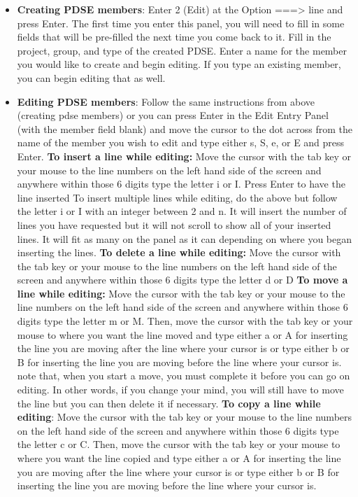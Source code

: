 \documentclass{report}
\begin{document}
\begin{itemize}
        \item \textbf{Creating PDSE members}: Enter 2 (Edit) at the Option ===> line and press Enter. The first time you enter this panel, you will need to fill in some fields that will be pre-filled the next time you come back to it.
            \bigbreak \noindent 
            Fill in the project, group, and type of the created PDSE. Enter a name for the member you would like to create and begin editing. If you type an existing member, you can begin editing that as well.
        \item \textbf{Editing PDSE members}: Follow the same instructions from above (creating pdse members) or you can press Enter in the Edit Entry Panel (with the member field blank) and move the cursor to the dot across from the name of the member you wish to edit and type either s, S, e, or E and press Enter.
            \bigbreak \noindent 
            \textbf{To insert a line while editing:} Move the cursor with the tab key or your mouse to the line numbers on the left hand side of the screen and anywhere within those 6 digits type the letter i or I.  Press Enter to have the line inserted
            \bigbreak \noindent 
            To insert multiple lines while editing, do the above but follow the letter i or I with an integer between 2 and n. It will insert the number of lines you have requested but it will not scroll to show all of your inserted lines. It will fit as many on the panel as it can depending on where you began inserting the lines.
            \bigbreak \noindent 
            \textbf{To delete a line while editing:} Move the cursor with the tab key or your mouse to the line numbers on the left hand side of the screen and anywhere within those 6 digits type the letter d or D
            \bigbreak \noindent 
            \textbf{To move a line while editing:} Move the cursor with the tab key or your mouse to the line numbers on the left hand side of the screen and anywhere within those 6 digits type the letter m or M. Then, move the cursor with the tab key or your mouse to where you want the line moved and type either a or A for inserting the line you are moving after the line where your cursor is or type either b or B for inserting the line you are moving before the line where your cursor is. note that, when you start a move, you must complete it before you can go on editing. In other words, if you change your mind, you will still have to move the line but you can then delete it if necessary.
            \bigbreak \noindent 
            \textbf{To copy a line while editing}: Move the cursor with the tab key or your mouse to the line numbers on the left hand side of the screen and anywhere within those 6 digits type the letter c or C. Then, move the cursor with the tab key or your mouse to where you want the line copied and type either a or A for inserting the line you are moving after the line where your cursor is or type either b or B for inserting the line you are moving before the line where your cursor is.

\end{itemize}
\end{document}
